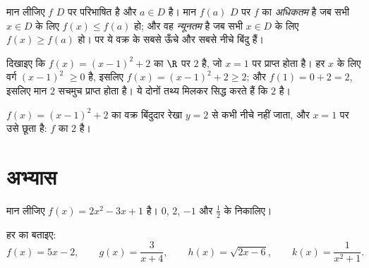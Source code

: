 \begin{definition}\label{def:g10:functions:extrema}
मान लीजिए $f$ $D$ पर परिभाषित है और $a \in D$ है। मान $f(a)$ $D$ पर $f$
का \emph{अधिकतम} है जब सभी $x \in D$ के लिए $f(x) \leq f(a)$ हो; और वह
\emph{न्यूनतम} है जब सभी $x \in D$ के लिए $f(x) \geq f(a)$ हो।  पर ये
वक्र के सबसे ऊँचे और सबसे नीचे बिंदु हैं।
\end{definition}

\begin{example}\label{ex:g10:functions:extremum}
दिखाइए कि $f(x) = (x - 1)^2 + 2$ का $\R$ पर  $2$ है, जो $x = 1$ पर प्राप्त होता है।
हर $x$ के लिए वर्ग $(x-1)^2$ $\geq 0$ है, इसलिए $f(x) = (x-1)^2 + 2 \geq 2$; और $f(1) = 0 + 2 = 2$, इसलिए मान $2$
सचमुच प्राप्त होता है। ये दोनों तथ्य मिलकर सिद्ध करते हैं कि  $2$
है।
\end{example}

\begin{omfigure}

{\small $f(x) = (x-1)^2 + 2$ का वक्र बिंदुदार रेखा $y = 2$ से कभी नीचे नहीं जाता, और $x = 1$
पर उसे छूता है: $f$ का  $2$ है।}
\end{omfigure}

\section{अभ्यास}

\begin{exercise}[$\star$]\label{exo:g10:functions:1}
मान लीजिए $f(x) = 2x^2 - 3x + 1$ है। $0$, $2$, $-1$ और $\frac12$ के  निकालिए।
\end{exercise}

\begin{exercise}[$\star$]\label{exo:g10:functions:2}
हर  का  बताइए:
\[
f(x) = 5x - 2, \qquad
g(x) = \frac{3}{x + 4}, \qquad
h(x) = \sqrt{2x - 6}, \qquad
k(x) = \frac{1}{x^2 + 1}.
\]
\end{exercise}

